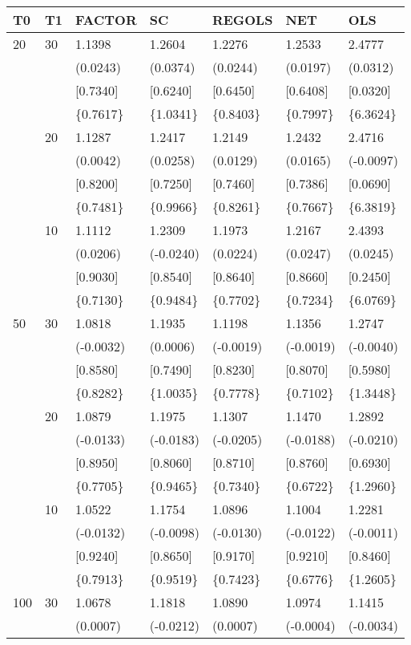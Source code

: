 \begin{table}[ht]
\centering
\begin{tabular}{lllllll}
\hline
T0&T1&FACTOR&SC&REGOLS&NET&OLS\\
\hline
20&30&1.1398&1.2604&1.2276&1.2533&2.4777\\
&&(0.0243)&(0.0374)&(0.0244)&(0.0197)&(0.0312)\\
&&[0.7340]&[0.6240]&[0.6450]&[0.6408]&[0.0320]\\
&&\{0.7617\}&\{1.0341\}&\{0.8403\}&\{0.7997\}&\{6.3624\}\\
&20&1.1287&1.2417&1.2149&1.2432&2.4716\\
&&(0.0042)&(0.0258)&(0.0129)&(0.0165)&(-0.0097)\\
&&[0.8200]&[0.7250]&[0.7460]&[0.7386]&[0.0690]\\
&&\{0.7481\}&\{0.9966\}&\{0.8261\}&\{0.7667\}&\{6.3819\}\\
&10&1.1112&1.2309&1.1973&1.2167&2.4393\\
&&(0.0206)&(-0.0240)&(0.0224)&(0.0247)&(0.0245)\\
&&[0.9030]&[0.8540]&[0.8640]&[0.8660]&[0.2450]\\
&&\{0.7130\}&\{0.9484\}&\{0.7702\}&\{0.7234\}&\{6.0769\}\\
50&30&1.0818&1.1935&1.1198&1.1356&1.2747\\
&&(-0.0032)&(0.0006)&(-0.0019)&(-0.0019)&(-0.0040)\\
&&[0.8580]&[0.7490]&[0.8230]&[0.8070]&[0.5980]\\
&&\{0.8282\}&\{1.0035\}&\{0.7778\}&\{0.7102\}&\{1.3448\}\\
&20&1.0879&1.1975&1.1307&1.1470&1.2892\\
&&(-0.0133)&(-0.0183)&(-0.0205)&(-0.0188)&(-0.0210)\\
&&[0.8950]&[0.8060]&[0.8710]&[0.8760]&[0.6930]\\
&&\{0.7705\}&\{0.9465\}&\{0.7340\}&\{0.6722\}&\{1.2960\}\\
&10&1.0522&1.1754&1.0896&1.1004&1.2281\\
&&(-0.0132)&(-0.0098)&(-0.0130)&(-0.0122)&(-0.0011)\\
&&[0.9240]&[0.8650]&[0.9170]&[0.9210]&[0.8460]\\
&&\{0.7913\}&\{0.9519\}&\{0.7423\}&\{0.6776\}&\{1.2605\}\\
100&30&1.0678&1.1818&1.0890&1.0974&1.1415\\
&&(0.0007)&(-0.0212)&(0.0007)&(-0.0004)&(-0.0034)\\

\end{tabular}
\end{table}
